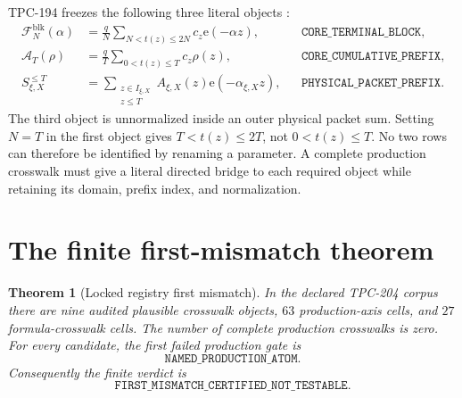 \documentclass[11pt]{article}
\newtheorem{theorem}{Theorem}
\newcommand{\e}{\mathrm{e}}
\begin{document}
TPC-194 freezes the following three literal objects \citep{WangTPC194}:
\begin{align*}
\mathcal F_N^{\mathrm{blk}}(\alpha)
 &=\frac qN\sum_{N<t(z)\le 2N}c_z\e(-\alpha z),
 &&\texttt{CORE\_TERMINAL\_BLOCK},\\
\mathcal A_T(\rho)
 &=\frac qT\sum_{0<t(z)\le T}c_z\rho(z),
 &&\texttt{CORE\_CUMULATIVE\_PREFIX},\\
S_{\xi,X}^{\le T}
 &=\sum_{\substack{z\in I_{\xi,X}\\z\le T}}
 A_{\xi,X}(z)\e(-\alpha_{\xi,X}z),
 &&\texttt{PHYSICAL\_PACKET\_PREFIX}.
\end{align*}
The third object is unnormalized inside an outer physical packet sum.  Setting
\(N=T\) in the first object gives \(T<t(z)\le2T\), not
\(0<t(z)\le T\).  No two rows can therefore be identified by renaming a
parameter.  A complete production crosswalk must give a literal directed
bridge to each required object while retaining its domain, prefix index, and
normalization.

\section{The finite first-mismatch theorem}

\begin{theorem}[Locked registry first mismatch]
\label{thm:first-mismatch}
In the declared TPC-204 corpus there are nine audited plausible crosswalk
objects, \(63\) production-axis cells, and \(27\) formula-crosswalk cells.
The number of complete production crosswalks is zero.  For every candidate,
the first failed production gate is
\[
\texttt{NAMED\_PRODUCTION\_ATOM}.
\]
Consequently the finite verdict is
\[
\texttt{FIRST\_MISMATCH\_CERTIFIED\_NOT\_TESTABLE}.
\]
\end{theorem}
\end{document}
